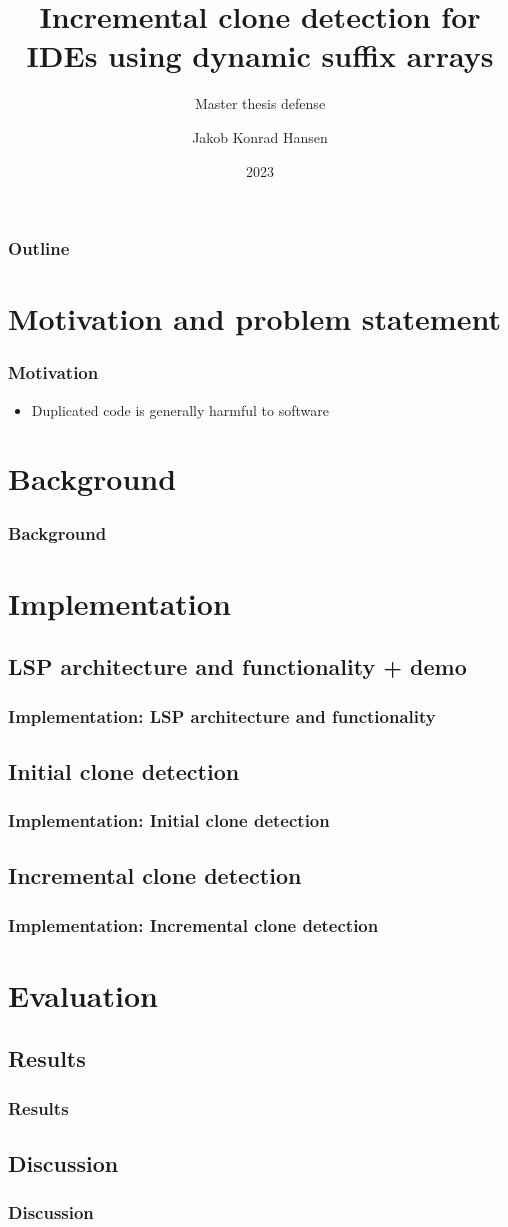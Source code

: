 \documentclass{beamer}
\title{Incremental clone detection for IDEs using dynamic suffix arrays}
\subtitle{Master thesis defense}
\author{Jakob Konrad Hansen}
\institute{University of Oslo}
\date{2023}
\begin{document}
\frame{\titlepage}

\begin{frame}
    \frametitle{Outline}
    \tableofcontents
\end{frame}

\section{Motivation and problem statement}

\begin{frame}
\frametitle{Motivation}
\begin{itemize}
    \item Duplicated code is generally harmful to software
\end{itemize}
\end{frame}

\section{Background}

\begin{frame}
\frametitle{Background}
\end{frame}

\section{Implementation}

\subsection{LSP architecture and functionality + demo}

\begin{frame}
\frametitle{Implementation: LSP architecture and functionality}
\end{frame}

\subsection{Initial clone detection}

\begin{frame}
\frametitle{Implementation: Initial clone detection}
\end{frame}

\subsection{Incremental clone detection}
\begin{frame}
\frametitle{Implementation: Incremental clone detection}
\end{frame}

\section{Evaluation}

\subsection{Results}
\begin{frame}
\frametitle{Results}
\end{frame}

\subsection{Discussion}
\begin{frame}
\frametitle{Discussion}
\end{frame}
\end{document}
